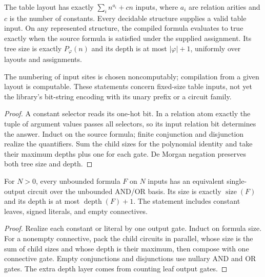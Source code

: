 \begin{theorem}
  \label{thm:desc-circuit-expansion}
  \leanok
  The table layout has exactly $\sum_i n^{a_i}+cn$ inputs, where $a_i$ are
  relation arities and $c$ is the number of constants. Every decidable structure
  supplies a valid table input. On any represented structure, the compiled
  formula evaluates to true exactly when the source formula is satisfied under
  the supplied assignment. Its tree size is exactly $P_\varphi(n)$ and its depth
  is at most $|\varphi|+1$, uniformly over layouts and assignments.

  The numbering of input sites is chosen noncomputably; compilation from a given
  layout is computable. These statements concern fixed-size table inputs, not
  yet the library's bit-string encoding with its unary prefix or a circuit family.
\end{theorem}
\begin{proof}
  \leanok
  A constant selector reads its one-hot bit. In a relation atom exactly the tuple
  of argument values passes all selectors, so its input relation bit determines
  the answer. Induct on the source formula; finite conjunction and disjunction
  realize the quantifiers. Sum the child sizes for the polynomial identity and
  take their maximum depths plus one for each gate. De Morgan negation preserves
  both tree size and depth.
\end{proof}

\begin{theorem}
  \label{thm:desc-formula-circuit}
  \leanok
  For $N>0$, every unbounded formula $F$ on $N$ inputs has an equivalent
  single-output circuit over the unbounded AND/OR basis. Its size is exactly
  $\operatorname{size}(F)$ and its depth is at most
  $\operatorname{depth}(F)+1$. The statement includes constant leaves, signed
  literals, and empty connectives.
\end{theorem}
\begin{proof}
  \leanok
  Realize each constant or literal by one output gate. Induct on formula size.
  For a nonempty connective, pack the child circuits in parallel, whose size
  is the sum of child sizes and whose depth is their maximum, then compose with
  one connective gate. Empty conjunctions and disjunctions use nullary AND and
  OR gates. The extra depth layer comes from counting leaf output gates.
\end{proof}

